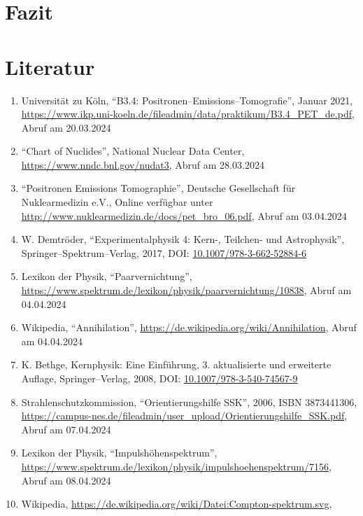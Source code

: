 \documentclass[12pt,a4paper]{scrartcl}
\numberwithin{equation}{section} %
\newcommand{\tightlist}{} %
\begin{document}
\clearpage
\hypertarget{fazit}{%
\section{Fazit}\label{fazit}}

\clearpage
\hypertarget{literatur}{%
\section{Literatur}\label{literatur}}

\begin{enumerate}
\def\labelenumi{\arabic{enumi}.}
\tightlist
\item
  Universität zu Köln, ``B3.4: Positronen--Emissions--Tomografie'',
  Januar 2021,
  \url{https://www.ikp.uni-koeln.de/fileadmin/data/praktikum/B3.4\_PET\_de.pdf},
  Abruf am 20.03.2024
\item
  ``Chart of Nuclides'', National Nuclear Data Center,
  \url{https://www.nndc.bnl.gov/nudat3}, Abruf am 28.03.2024
\item
  ``Positronen Emissions Tomographie'', Deutsche Gesellschaft für
  Nuklearmedizin e.V., Online verfügbar unter
  \url{http://www.nuklearmedizin.de/docs/pet_bro_06.pdf}, Abruf am
  03.04.2024
\item
  W. Demtröder, ``Experimentalphysik 4: Kern-, Teilchen- und
  Astrophysik'', Springer--Spektrum--Verlag, 2017, DOI:
  \href{https://link.springer.com/book/10.1007/978-3-662-52884-6}{10.1007/978-3-662-52884-6}
\item
  Lexikon der Physik, ``Paarvernichtung'',
  \url{https://www.spektrum.de/lexikon/physik/paarvernichtung/10838},
  Abruf am 04.04.2024
\item
  Wikipedia, ``Annihilation'',
  \url{https://de.wikipedia.org/wiki/Annihilation}, Abruf am 04.04.2024
\item
  K. Bethge, Kernphysik: Eine Einführung, 3. aktualisierte und
  erweiterte Auflage, Springer--Verlag, 2008, DOI:
  \href{https://doi.org/10.1007/978-3-540-74567-9}{10.1007/978-3-540-74567-9}
\item
  Strahlenschutzkommission, ``Orientierungshilfe SSK'', 2006, ISBN 3873441306,
  \url{https://campus-nes.de/fileadmin/user_upload/Orientierungshilfe_SSK.pdf}, Abruf am 07.04.2024
\item
  Lexikon der Physik, ``Impulshöhenspektrum'',
  \url{https://www.spektrum.de/lexikon/physik/impulshoehenspektrum/7156},
  Abruf am 08.04.2024
\item
  Wikipedia,
  \url{https://de.wikipedia.org/wiki/Datei:Compton-spektrum.svg},

\end{enumerate}
\end{document}

